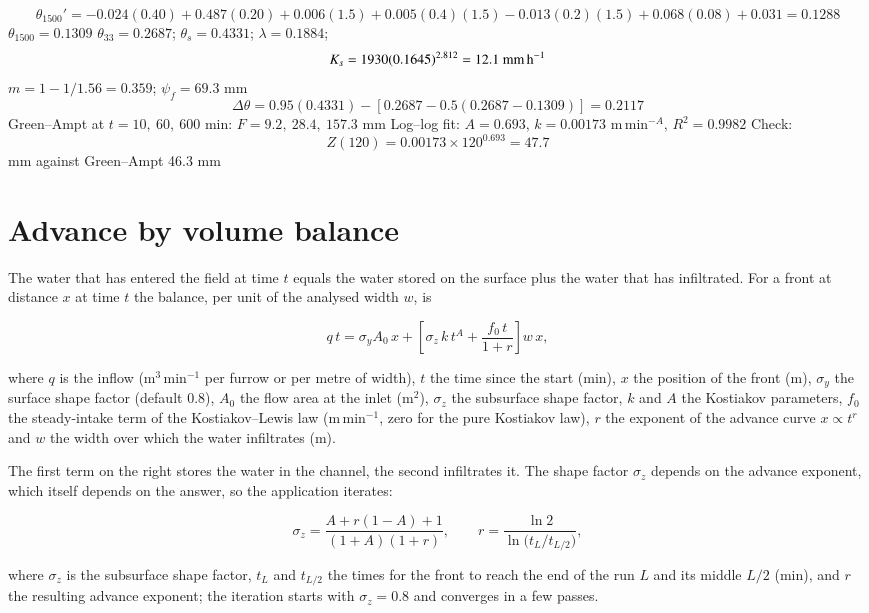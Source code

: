 \sol {}\ans \[\theta_{1500}'=-0.024(0.40)+0.487(0.20)+0.006(1.5)+0.005(0.4)(1.5)-0.013(0.2)(1.5)+0.068(0.08)+0.031=0.1288\]
$\theta_{1500}=0.1309$ \ans $\theta_{33}=0.2687$; $\theta_s=0.4331$; $\lambda=0.1884$; \[K_s=1930(0.1645)^{2.812}=12.1\ \text{mm\,h$^{-1}$}\] \ans $m=1-1/1.56=0.359$; $\psi_f=69.3$ mm \ans \[\Delta\theta=0.95(0.4331)-[0.2687-0.5(0.2687-0.1309)]=0.2117\] \ans Green--Ampt at $t=10,\ 60,\ 600$ min: $F=9.2,\ 28.4,\ 157.3$ mm \ans Log--log fit: $A=0.693$, $k=0.00173$ m\,min$^{-A}$, $R^2=0.9982$ \ans Check: \[Z(120)=0.00173\times120^{0.693}=47.7\] mm against Green--Ampt 46.3 mm \finans

\section{Advance by volume balance}\label{sec:vbal}
The water that has entered the field at time $t$ equals the water stored on the surface plus the water that has infiltrated. For a front at distance $x$ at time $t$ the balance, per unit of the analysed width $w$, is

\begin{equation}\boxed{q\,t=\sigma_yA_0\,x+\left[\sigma_z\,k\,t^{A}+\frac{f_0\,t}{1+r}\right]w\,x,}\label{eq:s-vb}\end{equation}
\par\noindent where $q$ is the inflow (m$^3$\,min$^{-1}$ per furrow or per metre of width), $t$ the time since the start (min), $x$ the position of the front (m), $\sigma_y$ the surface shape factor (default 0.8), $A_0$ the flow area at the inlet (m$^2$), $\sigma_z$ the subsurface shape factor, $k$ and $A$ the Kostiakov parameters, $f_0$ the steady-intake term of the Kostiakov--Lewis law (m\,min$^{-1}$, zero for the pure Kostiakov law), $r$ the exponent of the advance curve $x\propto t^{r}$ and $w$ the width over which the water infiltrates (m).



The first term on the right stores the water in the channel, the second infiltrates it. The shape factor $\sigma_z$ depends on the advance exponent, which itself depends on the answer, so the application iterates:

\begin{equation}\boxed{\sigma_z=\frac{A+r(1-A)+1}{(1+A)(1+r)},\qquad r=\frac{\ln2}{\ln\bigl(t_L/t_{L/2}\bigr)},}\label{eq:s-sz}\end{equation}
\par\noindent where $\sigma_z$ is the subsurface shape factor, $t_L$ and $t_{L/2}$ the times for the front to reach the end of the run $L$ and its middle $L/2$ (min), and $r$ the resulting advance exponent; the iteration starts with $\sigma_z=0.8$ and converges in a few passes.



